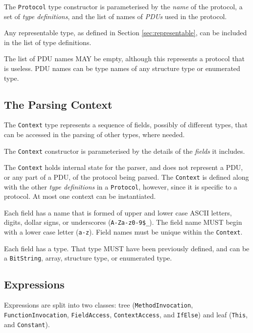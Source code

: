 \documentclass[10pt,twocolumn,a4paper]{article}
\newcommand{\code}[1]{\texttt{#1}}
\begin{document}
The \code{Protocol} type constructor is parameterised by the \emph{name} of the
protocol, a set of \emph{type definitions}, and the list of names of \emph{PDUs} used in
the protocol.

Any representable type, as defined in Section \ref{sec:representable}, can
be included in the list of type definitions.

The list of PDU names MAY be empty, although this represents a
protocol that is useless. PDU names can be type names of any structure type
or enumerated type. 

\subsection{The Parsing Context}
\label{sec:context}

The \code{Context} type
represents a sequence of fields, possibly of different types, that can be
accessed in the parsing of other types, where needed.

The \code{Context}
constructor is parameterised by the details of the \emph{fields} it includes.

The \code{Context} holds internal state for the parser, and does not
represent a PDU, or any part of a PDU, of the protocol being parsed.
The \code{Context} is defined along with the other \emph{type definitions}
in a \code{Protocol}, however, since it is specific to a protocol.
At most one context can be instantiated.

Each field has a name that is formed of upper and lower case ASCII letters,
digits, dollar signs, or underscores (\code{A-Za-z0-9\$\_}). The field name
MUST begin with a lower case letter (\code{a-z}). Field names must be unique
within the \code{Context}.

Each field has a type. That type MUST have been previously defined, and can
be a \code{BitString}, array, structure type, or enumerated type.

\subsection{Expressions}
\label{sec:expressions}

Expressions are split into two classes: 
tree (\code{MethodInvocation}, \code{FunctionInvocation}, \code{FieldAccess}, 
      \code{ContextAccess}, and \code{IfElse})
and 
leaf (\code{This}, and \code{Constant}).
\end{document}
